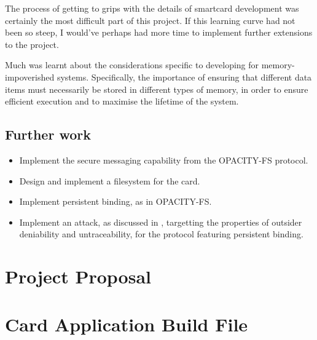 \documentclass[12pt,a4paper,twoside,openright]{report}
\begin{document}
The process of getting to grips with the details of smartcard development was certainly the most difficult part of this project. If this learning curve had not been so steep, I would've perhaps had more time to implement further extensions to the project.

Much was learnt about the considerations specific to developing for memory-impoverished systems. Specifically, the importance of ensuring that different data items must necessarily be stored in different types of memory, in order to ensure efficient execution and to maximise the lifetime of the system.

\section{Further work}

\begin{itemize}
\item Implement the secure messaging capability from the OPACITY-FS protocol.
\item Design and implement a filesystem for the card.
\item Implement persistent binding, as in OPACITY-FS.
\item Implement an attack, as discussed in \cite{opacityanalysis}, targetting the properties of outsider deniability and untraceability, for the protocol featuring persistent binding.
\end{itemize}



\appendix

\chapter{Project Proposal}
\label{appendix:proposal}



\chapter{Card Application Build File}
\label{appendix:cardappbuildfile}
\end{document}
